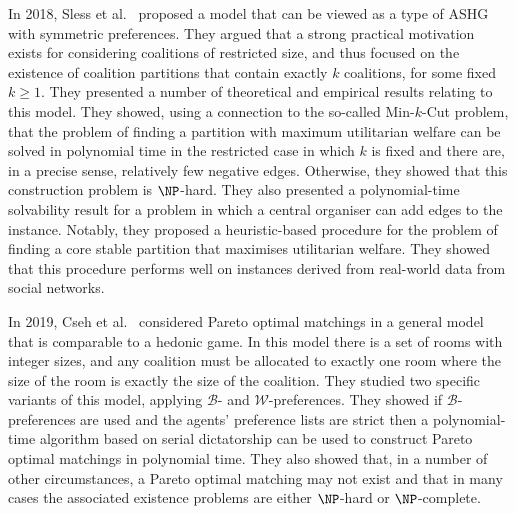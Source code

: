In 2018, Sless et al.~\cite{Sless18} proposed a model that can be viewed as a type of ASHG with symmetric preferences. They argued that a strong practical motivation exists for considering coalitions of restricted size, and thus focused on the existence of coalition partitions that contain exactly $k$ coalitions, for some fixed $k \geq 1$. They presented a number of theoretical and empirical results relating to this model. They showed, using a connection to the so-called Min-$k$-Cut problem, that the problem of finding a partition with maximum utilitarian welfare can be solved in polynomial time in the restricted case in which $k$ is fixed and there are, in a precise sense, relatively few negative edges. Otherwise, they showed that this construction problem is $\NP$-hard. They also presented a polynomial-time solvability result for a problem in which a central organiser can add edges to the instance. Notably, they proposed a heuristic-based procedure for the problem of finding a core stable partition that maximises utilitarian welfare. They showed that this procedure performs well on instances derived from real-world data from social networks.

In 2019, Cseh et al.~\cite{CSEH2019} considered Pareto optimal matchings in a general model that is comparable to a hedonic game. In this model there is a set of rooms with integer sizes, and any coalition must be allocated to exactly one room where the size of the room is exactly the size of the coalition. They studied two specific variants of this model, applying $\mathscr{B}$- and $\mathscr{W}$-preferences. They showed if $\mathscr{B}$-preferences are used and the agents' preference lists are strict then a polynomial-time algorithm based on serial dictatorship can be used to construct Pareto optimal matchings in polynomial time. They also showed that, in a number of other circumstances, a Pareto optimal matching may not exist and that in many cases the associated existence problems are either $\NP$-hard or $\NP$-complete.

